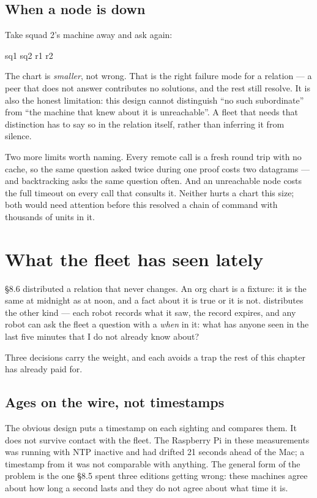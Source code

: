 \subsection{When a node is down}

Take squad 2's machine away and ask again:

\begin{repl}
sq1  sq2  r1  r2
\end{repl}

\noindent The chart is \emph{smaller}, not wrong. That is the right failure
mode for a relation --- a peer that does not answer contributes no solutions,
and the rest still resolve. It is also the honest limitation: this design
cannot distinguish ``no such subordinate'' from ``the machine that knew about
it is unreachable''. A fleet that needs that distinction has to say so in the
relation itself, rather than inferring it from silence.

Two more limits worth naming. Every remote call is a fresh round trip with no
cache, so the same question asked twice during one proof costs two datagrams
--- and backtracking asks the same question often. And an unreachable node
costs the full timeout on every call that consults it. Neither hurts a chart
this size; both would need attention before this resolved a chain of command
with thousands of units in it.

\section{What the fleet has seen lately}

\S8.6 distributed a relation that never changes. An org chart is a fixture:
it is the same at midnight as at noon, and a fact about it is true or it is
not.  distributes the other kind --- each robot records
what it saw, the record expires, and any robot can ask the fleet a question
with a \emph{when} in it: what has anyone seen in the last five minutes that
I do not already know about?

Three decisions carry the weight, and each avoids a trap the rest of this
chapter has already paid for.

\subsection{Ages on the wire, not timestamps}

The obvious design puts a timestamp on each sighting and compares them. It
does not survive contact with the fleet. The Raspberry Pi in these
measurements was running with NTP inactive and had drifted 21 seconds ahead
of the Mac; a timestamp from it was not comparable with anything. The general
form of the problem is the one \S8.5 spent three editions getting wrong:
these machines agree about how long a second lasts and they do not agree
about what time it is.

